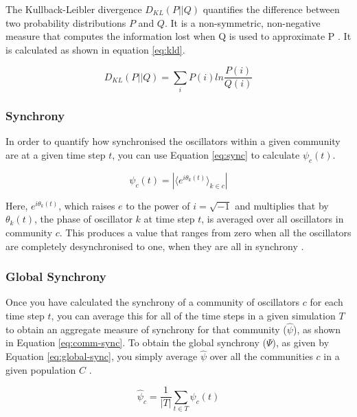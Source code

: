 \documentclass[a4paper,11pt]{article}
\begin{document}
The Kullback-Leibler divergence $D_{KL}(P || Q)$ quantifies the difference between two probability distributions $P$ and $Q$. It is a non-symmetric, non-negative measure that computes the information lost when Q is used to approximate P \cite{Burnham2002}. It is calculated as shown in equation \ref{eq:kld}.

\begin{equation}
\label{eq:kld}
D_{KL}(P || Q) = \sum_{i} P(i) ln \frac{P(i)}{Q(i)}
\end{equation}

\subsubsection{Synchrony}
\label{sec:bg:sync}

In order to quantify how synchronised the oscillators within a given community are at a given time step $t$, you can use Equation \ref{eq:sync} to calculate $\psi_c(t)$\cite{Shanahan2010}. 

\begin{equation} \label{eq:sync}
\psi_c(t) = |\langle e^{i\theta_k(t)}\rangle_{k \in c}|
\end{equation}

Here, $e^{i\theta_k(t)}$, which raises $e$ to the power of $i = \sqrt{-1}$ and multiplies that by $\theta_k(t)$, the phase of oscillator $k$ at time step $t$, is averaged over all oscillators in community $c$. This produces a value that ranges from zero when all the oscillators are completely desynchronised to one, when they are all in synchrony \cite{Shanahan2010}.

\subsubsection{Global Synchrony}
\label{sec:bg:global-sync}

Once you have calculated the synchrony of a community of oscillators $c$ for each time step $t$, you can average this for all of the time steps in a given simulation $T$ to obtain an aggregate measure of synchrony for that community ($\widehat{\psi}$), as shown in Equation \ref{eq:comm-sync}.  To obtain the global synchrony ($\Psi$), as given by Equation \ref{eq:global-sync}, you simply average $\widehat{\psi}$ over all the communities $c$ in a given population $C$ \cite{Shanahan2010}.

\begin{equation} \label{eq:comm-sync}
\widehat{\psi}_c = \frac{1}{|T|} \sum_{t \in T} \psi_c(t)
\end{equation}
\end{document}
